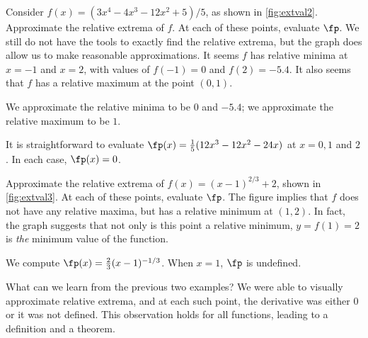 \begin{example}\label{ex_extval2}
Consider $f(x) = (3x^4-4x^3-12x^2+5)/5$, as shown in \autoref{fig:extval2}. Approximate the relative extrema of $f$. At each of these points, evaluate $\fp$.
\solution
We still do not have the tools to exactly find the relative extrema, but the graph does allow us to make reasonable approximations. It seems $f$ has relative minima at $x=-1$ and $x=2$, with values of $f(-1)=0$ and $f(2) = -5.4$. It also seems that $f$ has a relative maximum at the point $(0,1)$. 

We approximate the relative minima to be $0$ and $-5.4$; we approximate the relative maximum to be $1$.

It is straightforward to evaluate $\fp(x) =\frac15(12x^3-12x^2-24x)$ at $x=0, 1$ and $2$. In each case, $\fp(x) = 0$.
\end{example}


\begin{example}\label{ex_extval3}
Approximate the relative extrema of $f(x) = (x-1)^{2/3}+2$, shown in \autoref{fig:extval3}. At each of these points, evaluate $\fp$.
\solution
The figure implies that $f$ does not have any relative maxima, but has a relative minimum at $(1,2)$. In fact, the graph suggests that not only is this point a relative minimum, $y=f(1)=2$ is \emph{the} minimum value of the function.

We compute $\fp(x) = \frac23(x-1)^{-1/3}$. When $x=1$, $\fp$ is undefined.
\end{example}

What can we learn from the previous two examples? We were able to visually approximate relative extrema, and at each such point, the derivative was either 0 or it was not defined. This observation holds for all functions, leading to a definition and a theorem.

